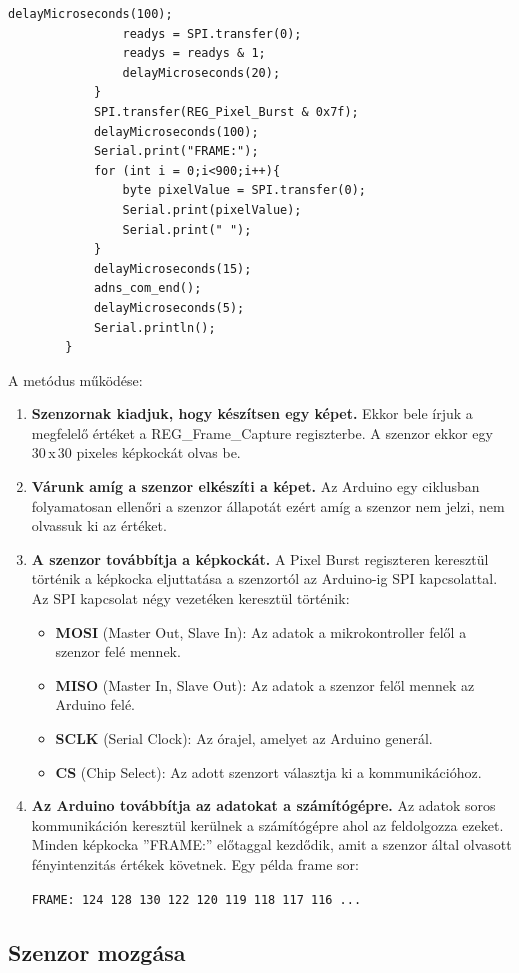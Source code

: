 \documentclass[]{thesis-ekf}
\theoremstyle{definition}
\theoremstyle{remark}
\begin{document}
\begin{enumerate}
\begin{lstlisting}[language=Arduino,label=sendFrame]
				delayMicroseconds(100); 
				readys = SPI.transfer(0); 
				readys = readys & 1;
				delayMicroseconds(20);
			}
			SPI.transfer(REG_Pixel_Burst & 0x7f); 
			delayMicroseconds(100); 
			Serial.print("FRAME:");
			for (int i = 0;i<900;i++){
				byte pixelValue = SPI.transfer(0);  
				Serial.print(pixelValue);
				Serial.print(" ");
			}
			delayMicroseconds(15); 
			adns_com_end();  
			delayMicroseconds(5); 
			Serial.println();
		}
	\end{lstlisting}
	A metódus működése:
	\begin{enumerate}[label=\arabic*.]
		\item \textbf{Szenzornak kiadjuk, hogy készítsen egy képet.} Ekkor bele írjuk a megfelelő értéket a REG\_Frame\_Capture regiszterbe. A szenzor ekkor egy 30\,x\,30 pixeles képkockát olvas be.
		\item \textbf{Várunk amíg a szenzor elkészíti a képet.} Az Arduino egy ciklusban folyamatosan ellenőri a szenzor állapotát ezért amíg a szenzor nem jelzi, nem olvassuk ki az értéket.
		\item \textbf{A szenzor továbbítja a képkockát.} A Pixel Burst regiszteren keresztül történik a képkocka eljuttatása a szenzortól az Arduino-ig SPI kapcsolattal. Az SPI kapcsolat négy vezetéken keresztül történik:
		\begin{itemize}
			\item \textbf{MOSI }(Master Out, Slave In): Az adatok a mikrokontroller felől a szenzor felé mennek.
			\item \textbf{MISO }(Master In, Slave Out): Az adatok a szenzor felől mennek az Arduino felé.
			\item \textbf{SCLK }(Serial Clock): Az órajel, amelyet az Arduino generál.
			\item \textbf{CS }(Chip Select): Az adott szenzort választja ki a kommunikációhoz.
		\end{itemize}
		\item \textbf{Az Arduino továbbítja az adatokat a számítógépre.} Az adatok soros kommunikáción keresztül kerülnek a számítógépre ahol az feldolgozza ezeket. Minden képkocka ''FRAME:'' előtaggal kezdődik, amit a szenzor által olvasott fényintenzitás értékek követnek. Egy példa frame sor:
		
		\verb|FRAME: 124 128 130 122 120 119 118 117 116 ...|
	\end{enumerate}
\end{enumerate}
\subsection{Szenzor mozgása}
\end{document}
